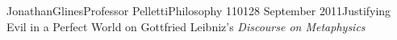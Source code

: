 \documentclass[12pt,letterpaper]{article}
\begin{document}
\begin{mla}{Jonathan}{Glines}{Professor Pelletti}{Philosophy 1101}{28 September 2011}{Justifying Evil in a Perfect World on Gottfried Leibniz's \textit{Discourse on Metaphysics}}

%


\end{mla}
\end{document}
